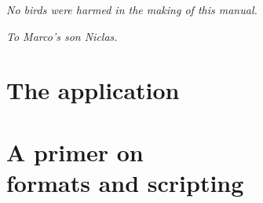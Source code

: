 \documentclass[a4paper,oneside,12pt]{memoir}
\begin{document}
\vspace*{25em}

\begin{flushright}
\em No birds were harmed in the making of this manual.
\end{flushright}






\cleardoublepage

\vspace*{25em}

\begin{flushright}
\em To Marco's son Niclas.
\end{flushright}

\cleardoublepage

\tableofcontents*

\cleardoublepage

%


\mainmatter



\part{The application}
\label{part:application}








\part[A primer on formats and scripting]{A primer on\\ formats and scripting}
\label{part:primer}




\printunsrtglossary
\end{document}
